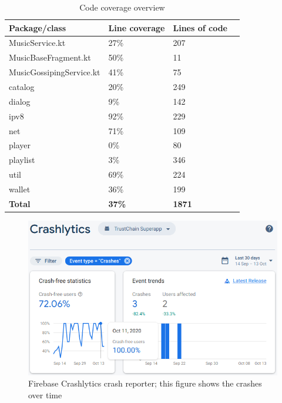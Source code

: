 
\begin{table}[]
\centering
\begin{tabular}{|l|l|l|l|}
\hline
\textbf{Package/class} & \textbf{Line coverage} & \textbf{Lines of code} \\ \hline
MusicService.kt        & 27\%   & 207         \\ \hline
MusicBaseFragment.kt   & 50\%  & 11            \\ \hline
MusicGossipingService.kt & 41\% & 75          \\ \hline
catalog                & 20\% & 249          \\ \hline
dialog                 & 9\% & 142          \\ \hline
ipv8                   & 92\% & 229          \\ \hline
net                    & 71\% & 109          \\ \hline
player                 & 0\% & 80             \\ \hline
playlist               & 3\% & 346           \\ \hline
util                   & 69\% & 224              \\ \hline
wallet                 & 36\% & 199           \\ \hline
\textbf{Total} & \textbf{37\%} & \textbf{1871} \\ \hline
\end{tabular}
\caption{Code coverage overview}
\label{tab:code-cov}
\end{table}

\begin{figure}
    \includegraphics[width=0.7\linewidth]{implementation/firebase-crashlytics.png}
    \caption{Firebase Crashlytics crash reporter; this figure shows the crashes over time}
    \label{fig:firebase-crashlytics}
\end{figure}